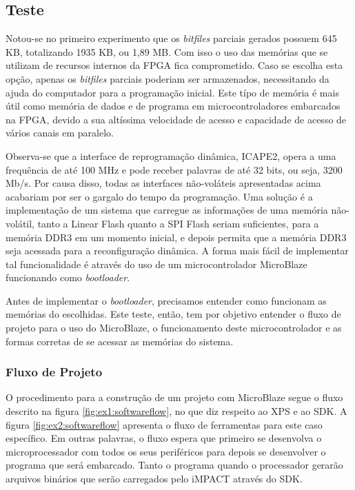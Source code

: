 \documentclass[11pt,a4paper,oneside]{book}
\begin{document}
\subsection{Teste}
Notou-se no primeiro experimento que os \textit{bitfiles} parciais gerados possuem 645 KB, totalizando 1935 KB, ou 1,89 MB.
Com isso o uso das memórias que se utilizam de recursos internos da FPGA fica comprometido.
Caso se escolha esta opção, apenas os \textit{bitfiles} parciais poderiam ser armazenados, necessitando da ajuda do computador para a programação inicial.
Este típo de memória é mais útil como memória de dados e de programa em microcontroladores embarcados na FPGA, devido a sua altíssima velocidade de acesso e capacidade de acesso de vários canais em paralelo.

Observa-se que a interface de reprogramação dinâmica, ICAPE2, opera a uma frequência de até 100 MHz e pode receber palavras de até 32 bits, ou seja, 3200 Mb/s.
Por causa disso, todas as interfaces não-voláteis apresentadas acima acabariam por ser o gargalo do tempo da programação.
Uma solução é a implementação de um sistema que carregue as informações de uma memória não-volátil, tanto a Linear Flash quanto a SPI Flash seriam suficientes, para a memória DDR3 em um momento inicial, e depois permita que a memória DDR3 seja acessada para a reconfiguração dinâmica.
A forma mais fácil de implementar tal funcionalidade é através do uso de um microcontrolador MicroBlaze funcionando como \textit{bootloader}.

Antes de implementar o \textit{bootloader}, precisamos entender como funcionam as memórias do escolhidas.
Este teste, então, tem por objetivo entender o fluxo de projeto para o uso do MicroBlaze, o funcionamento deste microcontrolador e as formas corretas de se acessar as memórias do sistema.

\subsubsection{Fluxo de Projeto}
O procedimento para a construção de um projeto com MicroBlaze segue o fluxo descrito na figura \ref{fig:ex1:softwareflow}, no que diz respeito ao XPS e ao SDK.
A figura \ref{fig:ex2:softwareflow} apresenta o fluxo de ferramentas para este caso específico.
Em outras palavras, o fluxo espera que primeiro se desenvolva o microprocessador com todos os seus periféricos para depois se desenvolver o programa que será embarcado.
Tanto o programa quando o processador gerarão arquivos binários que serão carregados pelo iMPACT através do SDK.
\end{document}
